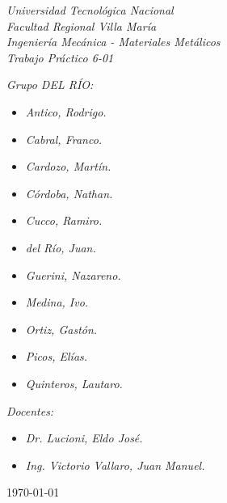 \begin{titlepage}
	
	\begin{center}
		{\huge \textit{Universidad Tecnológica Nacional}}\\
        \vspace{0.5cm}
		{\LARGE \textit{Facultad Regional Villa María}}\\
		\vspace{1.5cm}
        {\LARGE{\textit{Ingeniería Mecánica - Materiales Metálicos}}}\\
		\vspace{1.5cm}
        \LARGE{\textit{Trabajo Práctico 6-01}}
	\end{center}
	
	\vfill

    \textit{Grupo DEL RÍO:}
	\begin{itemize}
		\item \textit{Antico, Rodrigo.}
		\item \textit{Cabral, Franco.}
        \item \textit{Cardozo, Martín.}
        \item \textit{Córdoba, Nathan.}
        \item \textit{Cucco, Ramiro.}
        \item \textit{del Río, Juan.}
        \item \textit{Guerini, Nazareno.}
        \item \textit{Medina, Ivo.}
        \item \textit{Ortiz, Gastón.}
        \item \textit{Picos, Elías.}
        \item \textit{Quinteros, Lautaro.}
	\end{itemize}
    
	\textit{Docentes:}
	\begin{itemize}
		\item \textit{Dr. Lucioni, Eldo José.}
		\item \textit{Ing. Victorio Vallaro, Juan Manuel.}
	\end{itemize}
	\centering
	\today
	
\end{titlepage}
